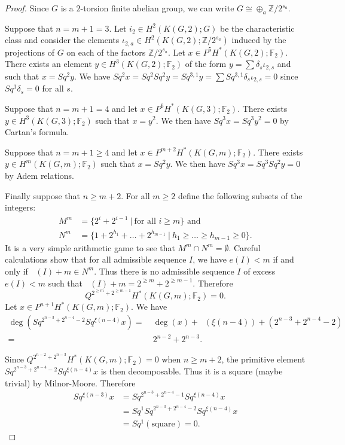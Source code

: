 \documentclass{conm-p-l}
\theoremstyle{definition}
\DeclareMathOperator{\degst}{deg_{st}}
\newcommand{\Z}{\mathbb{Z}}
\newcommand{\F}{\mathbb{F}}
\renewcommand{\geq}{\geqslant}
\begin{document}
\begin{proof}
Since $G$ is a $2$-torsion finite abelian group, we can write $G\cong\oplus_a\Z/2^{s_a}$. 

Suppose that $n=m+1=3$. Let $i_2\in H^2(K(G,2);G)$ be the characteristic class and consider the elements $\iota_{2,a}\in H^2(K(G,2);\Z/2^{s_a})$ induced by the projections of $G$ on each of the factors $\Z/2^{s_a}$. Let $x\in P^5H^*(K(G,2);\F_2)$. There exists an element $y\in H^3(K(G,2);\F_2)$ of the form $y=\sum\delta_s\iota_{2,s}$ and such that $x=Sq^2y$. We have $Sq^2x=Sq^2Sq^2y=Sq^{3,1}y=\sum Sq^{3,1}\delta_s\iota_{2,s}=0$ since $Sq^1\delta_s=0$ for all $s$.

Suppose that $n=m+1=4$ and let $x\in P^6H^*(K(G,3);\F_2)$. There exists $y\in H^3(K(G,3);\F_2)$ such that $x=y^2$. We then have $Sq^3x=Sq^3y^2=0$ by Cartan's formula.

Suppose that $n=m+1\geq4$ and let $x\in P^{m+2}H^*(K(G,m);\F_2)$. There exists $y\in H^m(K(G,m);\F_2)$ such that $x=Sq^2y$. We then have $Sq^3 x=Sq^3Sq^2y=0$ by Adem relations.

Finally suppose that $n\geq m+2$. For all $m\geq2$ define the following subsets of the integers:
\begin{align*}
M^m &=\{2^i+2^{i-1}\ |\ \text{for all $i\geq m$}\} \text{ and}\\
N^m &=\{1+2^{h_1}+\dots+2^{h_{m-1}}\ |\ h_1\geq\dots\geq h_{m-1}\geq0\}.
\end{align*}
It is a very simple arithmetic game to see that $M^m\cap N^m=\emptyset$. Careful calculations show that for all admissible sequence $I$, we have $e(I)<m$ if and only if $\degst(I)+m\in N^m$. Thus there is no admissible sequence $I$ of excess $e(I)<m$ such that $\degst(I)+m=2^{\geq m}+2^{\geq m-1}$. Therefore
$$
Q^{2^{\geq m}+2^{\geq m-1}}H^*(K(G,m);\F_2)=0.
$$
Let $x\in P^{n+1}H^*(K(G,m);\F_2)$. We have
\begin{align*}
\deg(Sq^{2^{n-3}+2^{n-4}-2}Sq^{\xi(n-4)}x) = &\ \deg(x) + \degst(\xi(n-4)) + (2^{n-3}+2^{n-4}-2)\\
= &\ 2^{n-2}+2^{n-3}.
\end{align*}

Since $Q^{2^{n-2}+2^{n-3}}H^*(K(G,m);\F_2)=0$ when $n\geq m+2$, the primitive element $Sq^{2^{n-3}+2^{n-4}-2}Sq^{\xi(n-4)}x$ is then decomposable. Thus it is a square (maybe trivial) by Milnor-Moore. Therefore 
\begin{align*}
Sq^{\xi(n-3)}x &= Sq^{2^{n-3}+2^{n-4}-1}Sq^{\xi(n-4)}x\\
&=Sq^1Sq^{2^{n-3}+2^{n-4}-2}Sq^{\xi(n-4)}x\\
&=Sq^1(\text{square}) =0.
\end{align*}

\end{proof}
\end{document}
